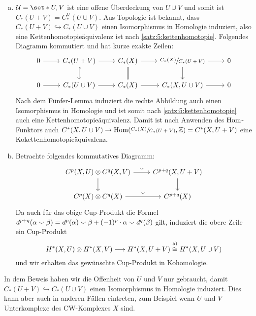 \begin{beweis}
	\leavevmode
	\begin{enumerate}[(a)]
		\item $\mathcal{U}=\set*{U,V}$ ist eine offene Überdeckung von $U \cup V$ und somit ist $C_*(U+V)=C_*^{\mathcal{U}}(U\cup V)$.
		Aus Topologie  ist bekannt, dass $C_*(U + V) \hookrightarrow C_*(U \cup V)$ einen Isomorphismus in Homologie induziert, also eine Kettenhomotopieäquivalenz ist nach \autoref{satz:5:kettenhomotopie}.
		Folgendes Diagramm kommutiert und hat kurze exakte Zeilen:
		\[
			\begin{tikzcd}
				0 \rar & C_*(U+V)\dar[hook] \rar & C_*(X) \dar[equal] \rar & \sfrac{C_*(X)}{C_*(U +V)} \dar \rar & 0 \\
				0 \rar & C_*(U \cup V) \rar & C_*(X) \rar & C_*(X, U \cup V) \rar & 0
			\end{tikzcd}
		\]
		Nach dem Fünfer-Lemma induziert die rechte Abbildung auch einen Isomorphismus in Homologie und ist somit nach \autoref{satz:5:kettenhomotopie} auch eine Kettenhomotopieäquivalenz.
		Damit ist nach Anwenden des $\operatorname{Hom}$-Funktors auch $C^*(X, U \cup V) \to \Hom \enbrace*{\sfrac{C_*(X)}{C_*(U +V)}, \mathbb{Z}} = C^*(X, U + V)$ eine Kokettenhomotopieäquivalenz.
		\item Betrachte folgendes kommutatives Diagramm:
		\[
			\begin{tikzcd}
				C^p(X,U) \otimes C^q(X,V) \dar \rar["\cupp"] & C^{p+q}(X,U+V) \dar \\
				C^p(X) \otimes C^q(X) \rar["\cupp"] & C^{p+q}(X) 
			\end{tikzcd}
		\]
		Da auch für das obige Cup-Produkt die Formel $d^{p+q}(\alpha \smallsmile \beta) = d^p(\alpha) \smallsmile \beta + (-1)^p \cdot \alpha \smallsmile d^q(\beta)$ gilt, induziert die obere Zeile ein Cup-Produkt
		\[
			H^*(X,U) \otimes H^*(X,V) \longrightarrow H^*(X, U+ V) \stackrel{\mbox{\scriptsize a)}}{\cong} H^*(X, U \cup V)
		\]
		und wir erhalten das gewünschte Cup-Produkt in Kohomologie. \qedhere
	\end{enumerate}
\end{beweis}
In dem Beweis haben wir die Offenheit von $U$ und $V$ nur gebraucht, damit $C_*(U + V) \hookrightarrow C_*(U \cup V)$ einen Isomorphismus in Homologie induziert.
Dies kann aber auch in anderen Fällen eintreten, zum Beispiel wenn $U$ und $V$ Unterkomplexe des CW-Komplexes $X$ sind.
